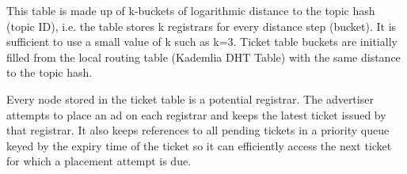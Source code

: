 This table is made up of k-buckets of logarithmic distance to the topic hash (topic ID), i.e. the table stores k registrars for every distance step (bucket). It is sufficient to use a small value of k such as k=3. 
Ticket table buckets are initially filled from the local routing table (Kademlia DHT Table) with the same distance to the topic hash.

Every node stored in the ticket table is a potential registrar. The advertiser attempts to place an ad on each registrar and keeps the latest ticket issued by that registrar. It also keeps references to all pending tickets in a priority queue keyed by the expiry time of the ticket so it can efficiently access the next ticket for which a placement attempt is due.

